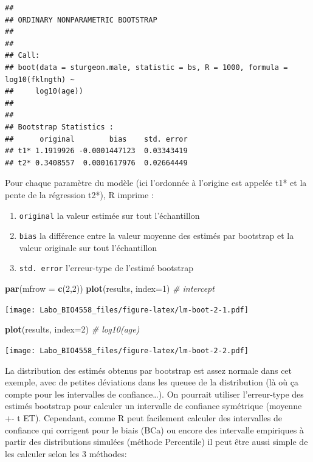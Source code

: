 \documentclass[12pt,]{book}
\newenvironment{Shaded}{\begin{snugshade}}{\end{snugshade}}
\newcommand{\CommentTok}[1]{\textcolor[rgb]{0.56,0.35,0.01}{\textit{#1}}}
\newcommand{\DataTypeTok}[1]{\textcolor[rgb]{0.13,0.29,0.53}{#1}}
\newcommand{\DecValTok}[1]{\textcolor[rgb]{0.00,0.00,0.81}{#1}}
\newcommand{\KeywordTok}[1]{\textcolor[rgb]{0.13,0.29,0.53}{\textbf{#1}}}
\newcommand{\NormalTok}[1]{#1}
\providecommand{\tightlist}{%
  \setlength{\itemsep}{0pt}\setlength{\parskip}{0pt}}
\begin{document}
\begin{verbatim}
## 
## ORDINARY NONPARAMETRIC BOOTSTRAP
## 
## 
## Call:
## boot(data = sturgeon.male, statistic = bs, R = 1000, formula = log10(fklngth) ~ 
##     log10(age))
## 
## 
## Bootstrap Statistics :
##      original        bias    std. error
## t1* 1.1919926 -0.0001447123  0.03343419
## t2* 0.3408557  0.0001617976  0.02664449
\end{verbatim}

Pour chaque paramètre du modèle (ici l'ordonnée à l'origine est
appelée t1* et la pente de la régression t2*), R imprime :

\begin{enumerate}
\def\labelenumi{\arabic{enumi}.}
\tightlist
\item
  \texttt{original} la valeur estimée sur tout l'échantillon
\item
  \texttt{bias} la différence entre la valeur moyenne des estimés par bootstrap et la valeur originale sur tout l'échantillon
\item
  \texttt{std.\ error} l'erreur-type de l'estimé bootstrap
\end{enumerate}

\begin{Shaded}
\begin{Highlighting}[]
\KeywordTok{par}\NormalTok{(}\DataTypeTok{mfrow =} \KeywordTok{c}\NormalTok{(}\DecValTok{2}\NormalTok{,}\DecValTok{2}\NormalTok{))}
\KeywordTok{plot}\NormalTok{(results, }\DataTypeTok{index=}\DecValTok{1}\NormalTok{) }\CommentTok{# intercept}
\end{Highlighting}
\end{Shaded}

\texttt{[image: Labo\_BIO4558\_files/figure-latex/lm-boot-2-1.pdf]}

\begin{Shaded}
\begin{Highlighting}[]
\KeywordTok{plot}\NormalTok{(results, }\DataTypeTok{index=}\DecValTok{2}\NormalTok{) }\CommentTok{# log10(age)}
\end{Highlighting}
\end{Shaded}

\texttt{[image: Labo\_BIO4558\_files/figure-latex/lm-boot-2-2.pdf]}

La distribution des estimés obtenus par bootstrap est assez normale dans cet exemple, avec de petites déviations dans les queuee de la distribution (là où ça compte pour les intervalles de confiance\ldots{}). On pourrait utiliser l'erreur-type des estimés bootstrap pour calculer un intervalle de confiance symétrique (moyenne +- t ET). Cependant, comme R peut facilement calculer des intervalles de confiance qui corrigent pour le biais (BCa) ou encore des intervalle empiriques à partir des distributions simulées (méthode Percentile) il peut être aussi simple de les calculer selon les 3 méthodes:
\end{document}
